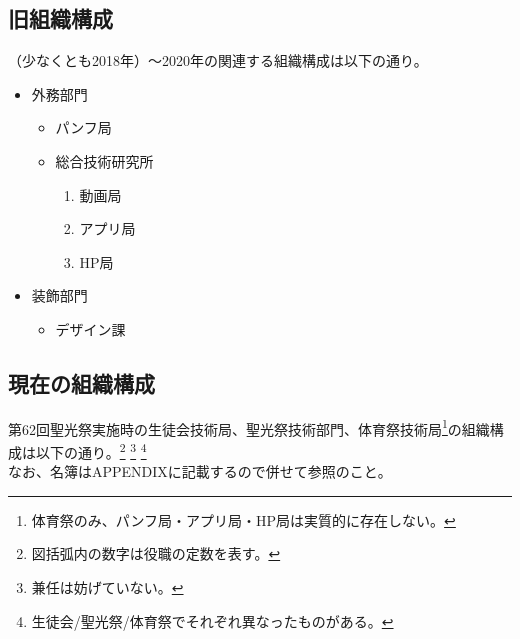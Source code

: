 \documentclass[dvipdfmx,jb5]{jarticle}
\begin{document}
\subsection{旧組織構成}
（少なくとも2018年）〜2020年の関連する組織構成は以下の通り。
\begin{itemize}
\item 外務部門
  \begin{itemize}
  \item パンフ局
  \item 総合技術研究所
    \begin{enumerate}[−]
    \item 動画局
    \item アプリ局
    \item HP局
    \end{enumerate}
  \end{itemize}
\item 装飾部門
  \begin{itemize}
  \item デザイン課
  \end{itemize}
\end{itemize}

\subsection{現在の組織構成}
第62回聖光祭実施時の生徒会技術局、聖光祭技術部門、体育祭技術局\footnote{体育祭のみ、パンフ局・アプリ局・HP局は実質的に存在しない。}の組織構成は以下の通り。\footnote{図括弧内の数字は役職の定数を表す。} \footnote{兼任は妨げていない。} \footnote{生徒会/聖光祭/体育祭でそれぞれ異なったものがある。}\\
なお、名簿はAPPENDIXに記載するので併せて参照のこと。
\end{document}
